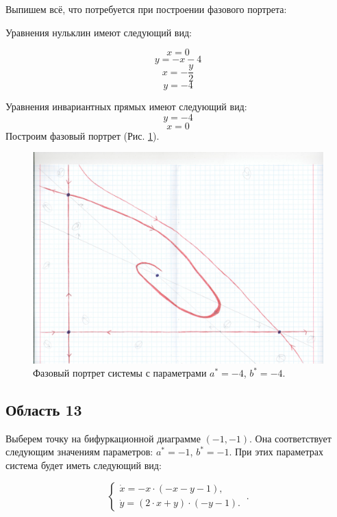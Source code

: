 Выпишем всё, что потребуется при построении фазового портрета:

Уравнения нульклин имеют следующий вид: 

$$x=0$$
$$y=- x - 4$$
$$x=- \frac{y}{2}$$
$$y=-4$$


Уравнения инвариантных прямых имеют следующий вид: 
$$y = -4$$
$$x = 0$$
Построим фазовый портрет (Рис. \ref{fig:phportr12}).

\begin{figure}[h]
	
	\includegraphics[width=\textwidth]{phptr/(-4,-1).jpeg}
	\centering
	\caption{\label{fig:phportr12} Фазовый портрет системы с параметрами $a^\ast = -4$, $b^\ast = -4$.}
	
\end{figure}

\subsection{Область 13}

Выберем точку на бифуркационной диаграмме $(-1, -1)$. Она соответствует следующим значениям параметров:  $a^\ast = -1$, $b^\ast = -1$. При этих параметрах система будет иметь следующий вид: 

$$
\left \lbrace 
\begin{matrix} 
	\dot{x} = -x \cdot (-x - y - 1), \\
	\dot{y} = (2 \cdot x + y) \cdot (-y - 1). \
\end{matrix} 
\right . .$$


